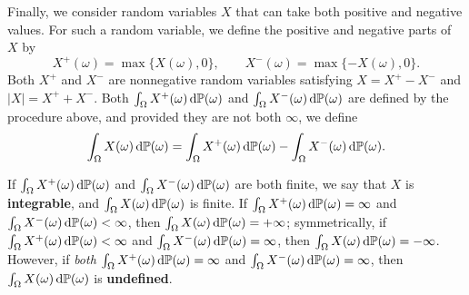 Finally, we consider random variables $X$ that can take both positive and negative values. For such a random variable, we define the positive and negative parts of $X$ by
\[
X^{+}(\omega) = \max\{X(\omega), 0\}, \qquad X^{-}(\omega) = \max\{-X(\omega), 0\}.
\]
Both $X^{+}$ and $X^{-}$ are nonnegative random variables satisfying $X = X^{+} - X^{-}$ and $|X| = X^{+} + X^{-}$. Both $\int_{\Omega} X^{+}(\omega)\,\mathrm{d}\mathbb{P}(\omega)$ and $\int_{\Omega} X^{-}(\omega)\,\mathrm{d}\mathbb{P}(\omega)$ are defined by the procedure above, and provided they are not both $\infty$, we define
\[
\int_{\Omega} X(\omega)\,\mathrm{d}\mathbb{P}(\omega) = \int_{\Omega} X^{+}(\omega)\,\mathrm{d}\mathbb{P}(\omega) - \int_{\Omega} X^{-}(\omega)\,\mathrm{d}\mathbb{P}(\omega).
\]

If $\int_{\Omega} X^{+}(\omega)\,\mathrm{d}\mathbb{P}(\omega)$ and $\int_{\Omega} X^{-}(\omega)\,\mathrm{d}\mathbb{P}(\omega)$ are both finite, we say that $X$ is \textbf{integrable}, and $\int_{\Omega} X(\omega)\,\mathrm{d}\mathbb{P}(\omega)$ is finite. If $\int_{\Omega} X^{+}(\omega)\,\mathrm{d}\mathbb{P}(\omega) = \infty$ and $\int_{\Omega} X^{-}(\omega)\,\mathrm{d}\mathbb{P}(\omega) < \infty$, then $\int_{\Omega} X(\omega)\,\mathrm{d}\mathbb{P}(\omega) = +\infty$; symmetrically, if $\int_{\Omega} X^{+}(\omega)\,\mathrm{d}\mathbb{P}(\omega) < \infty$ and $\int_{\Omega} X^{-}(\omega)\,\mathrm{d}\mathbb{P}(\omega) = \infty$, then $\int_{\Omega} X(\omega)\,\mathrm{d}\mathbb{P}(\omega) = -\infty$. However, if \emph{both} $\int_{\Omega} X^{+}(\omega)\,\mathrm{d}\mathbb{P}(\omega) = \infty$ and $\int_{\Omega} X^{-}(\omega)\,\mathrm{d}\mathbb{P}(\omega) = \infty$, then $\int_{\Omega} X(\omega)\,\mathrm{d}\mathbb{P}(\omega)$ is \textbf{undefined}.

